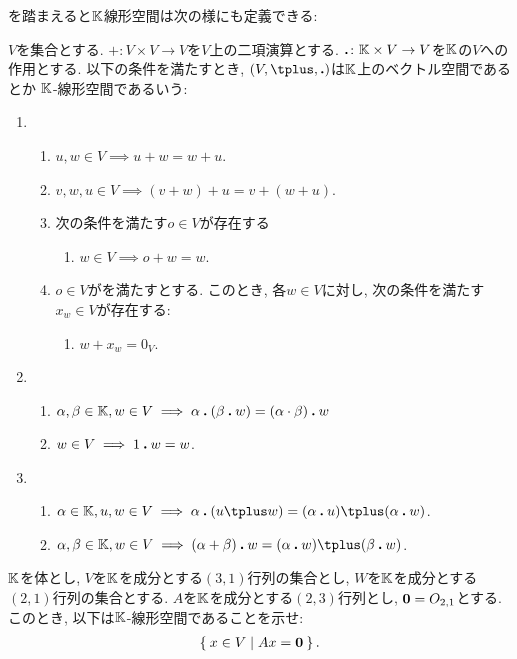 を踏まえると$\mathbb{K}$線形空間は次の様にも定義できる:
\begin{definition}
$V$を集合とする.
$\plus\colon V\times V \to V$を$V$上の二項演算とする.
$\mathbin{\boldsymbol{.}} \colon \mathbb{K}\times V \to V$を$\mathbb{K}$の$V$への作用とする.
以下の条件を満たすとき,
$(V,\plus,\act)$は$\mathbb{K}$上のベクトル空間であるとか
$\mathbb{K}$-線形空間であるいう:
  \begin{enumerate}
  \item 
    \begin{enumerate}
    \item $u,w \in V\implies  u\plus w=w\plus u$.
    \item
      $v,w,u\in V \implies (v\plus w)\plus u=v\plus (w\plus u)$.
    \item
    次の条件を満たす$o\in V$が存在する
    \begin{enumerate}
          \label{def:vecsp:item:sum:zero}
    \item $w\in V \implies o\plus w=w$.
    \end{enumerate}
    \item
    $o\in V$がを満たすとする.
    このとき,
    各$w\in V$に対し, 次の条件を満たす$x_w\in V$が存在する:
\begin{enumerate}
\item $w\plus x_w=0_V$.
\end{enumerate}
    \end{enumerate}
  \item
    \begin{enumerate}
    \item
      $\alpha ,\beta\in\mathbb{K}, w\in V \implies \alpha \mathbin{\boldsymbol{.}} (\beta\mathbin{\boldsymbol{.}} w)=(\alpha \cdot \beta)\mathbin{\boldsymbol{.}} w$
    \item $w\in V \implies 1\mathbin{\boldsymbol{.}} w=w$.
    \end{enumerate}
  \item
    \begin{enumerate}
    \item $\alpha \in \KK,u,w\in V \implies \alpha \act (u\plus w)=(\alpha \act u)\plus (\alpha \act w)$.
    \item $\alpha ,\beta\in\KK, w\in V\implies (\alpha +\beta)\act w=(\alpha\act w)\plus (\beta\act w)$.
    \end{enumerate}
  \end{enumerate}
\end{definition}




\begin{quiz}
  $\mathbb{K}$を体とし,
  $V$を$\mathbb{K}$を成分とする$(3,1)$行列の集合とし,
  $W$を$\mathbb{K}$を成分とする$(2,1)$行列の集合とする.
  $A$を$\mathbb{K}$を成分とする$(2,3)$行列とし,
  $\boldsymbol{0}=O_{2,1}$とする.
  このとき, 以下は$\mathbb{K}$-線形空間であることを示せ:
  \begin{align*}
    \Set{x\in V|Ax=\boldsymbol{0}}.
  \end{align*}
\end{quiz}

